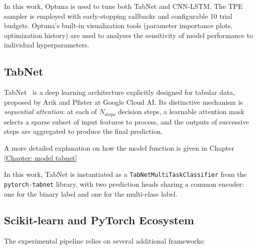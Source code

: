\documentclass[../main.tex]{subfiles}
\begin{document}
In this work, Optuna is used to tune both TabNet and CNN-LSTM.  The TPE sampler is employed with early-stopping callbacks and configurable 10 trial budgets.  Optuna's built-in visualization tools (parameter importance plots, optimization history) are used to analyses the sensitivity of model performance to individual hyperparameters.

\newpage
\subsection{TabNet}
\label{sec:tech-tabnet}

TabNet~\supercite{arik2021tabnet} is a deep learning architecture explicitly designed for tabular data, proposed by Arik and Pfister at Google Cloud AI.  Its distinctive mechanism is \emph{sequential attention}: at each of $N_{\text{steps}}$ decision steps, a learnable attention mask selects a sparse subset of input features to process, and the outputs of successive steps are aggregated to produce the final prediction.

A more detailed explanation on how the model function is given in Chapter \ref{Chapter: model tabnet}

In this work, TabNet is instantiated as a \texttt{TabNetMultiTaskClassifier} from the \texttt{pytorch-tabnet} library\supercite{pytorch_tabnet}, with two prediction heads sharing a common encoder: one for the binary label and one for the multi-class label.


\subsection{Scikit-learn and PyTorch Ecosystem}
\label{sec:tech-sklearn-pytorch}

The experimental pipeline relies on several additional frameworks:
\end{document}
